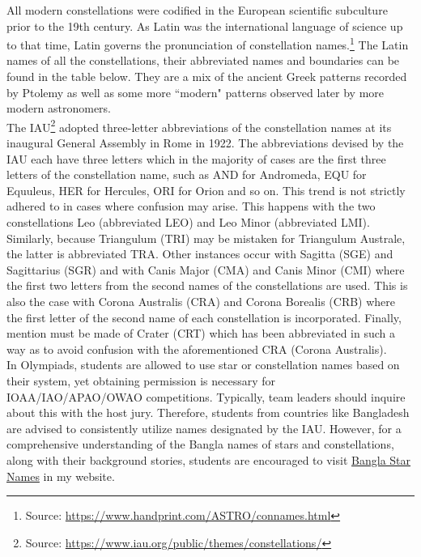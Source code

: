 \documentclass[a4paper,12pt]{extarticle}
\begin{document}
All modern constellations were codified in the European scientific subculture prior to the 19th century. As Latin was the international language of science up to that time, Latin governs the pronunciation of constellation names.\footnote{Source: \url{https://www.handprint.com/ASTRO/connames.html}} The Latin names of all the constellations, their abbreviated names and boundaries can be found in the table below. They are a mix of the ancient Greek patterns recorded by Ptolemy as well as some more ``modern" patterns observed later by more modern astronomers.\\

The IAU\footnote{Source: \url{https://www.iau.org/public/themes/constellations/}} adopted three-letter abbreviations of the constellation names at its inaugural General Assembly in Rome in 1922. The abbreviations devised by the IAU each have three letters which in the majority of cases are the first three letters of the constellation name, such as AND for Andromeda, EQU for Equuleus, HER for Hercules, ORI for Orion and so on. This trend is not strictly adhered to in cases where confusion may arise. This happens with the two constellations Leo (abbreviated LEO) and Leo Minor (abbreviated LMI). Similarly, because Triangulum (TRI) may be mistaken for Triangulum Australe, the latter is abbreviated TRA. Other instances occur with Sagitta (SGE) and Sagittarius (SGR) and with Canis Major (CMA) and Canis Minor (CMI) where the first two letters from the second names of the constellations are used. This is also the case with Corona Australis (CRA) and Corona Borealis (CRB) where the first letter of the second name of each constellation is incorporated. Finally, mention must be made of Crater (CRT) which has been abbreviated in such a way as to avoid confusion with the aforementioned CRA (Corona Australis).\\

In Olympiads, students are allowed to use star or constellation names based on their system, yet obtaining permission is necessary for IOAA/IAO/APAO/OWAO competitions. Typically, team leaders should inquire about this with the host jury. Therefore, students from countries like Bangladesh are advised to consistently utilize names designated by the IAU. However, for a comprehensive understanding of the Bangla names of stars and constellations, along with their background stories, students are encouraged to visit \href{https://rajit13.github.io/astro-bangla-dict.html#bn-star-names}{Bangla Star Names} in my website.\\
\end{document}

